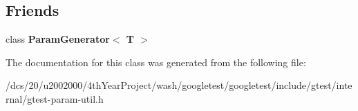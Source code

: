 \subsection*{Friends}
\begin{DoxyCompactItemize}
\item 
\mbox{\label{classtesting_1_1internal_1_1ParamIterator_ab73a355ae191f2f7eab54b65ca557714}} 
class {\bfseries Param\+Generator$<$ T $>$}
\end{DoxyCompactItemize}


The documentation for this class was generated from the following file\+:\begin{DoxyCompactItemize}
\item 
/dcs/20/u2002000/4th\+Year\+Project/wash/googletest/googletest/include/gtest/internal/gtest-\/param-\/util.\+h\end{DoxyCompactItemize}
